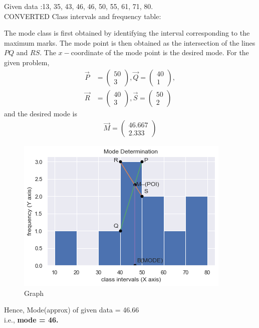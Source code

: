 \documentclass[journal,12pt,twocolumn]{IEEEtran}
\begin{document}
Given data :13, 35, 43, 46, 46, 50, 55, 61, 71, 80.\\ [12pt]
CONVERTED Class intervals and frequency table:\\[16pt]

\begin{table}[h]
    \centering
	
    \caption{}
    \label{TABLE}
\end{table}

The mode class is first obtained by identifying the interval corresponding to the maximum marks. The mode point is then obtained as the intersection of the lines $PQ$ and $RS$. The $x-$coordinate of the mode point is the desired mode. For the
given problem,\\
\newcommand{\myvec}[1]{\ensuremath{\begin{pmatrix}#1\end{pmatrix}}}
	\begin{align}
	\vec{P} &= \myvec{50 \\ 3},
	\vec{Q} = \myvec{40 \\ 1},\\[12pt]
	\vec{R} &= \myvec{40 \\ 3},
	\vec{S} = \myvec{50 \\ 2}
 	\end{align}
and the desired mode is
\begin{align}
	\vec{M} = \myvec{46.667 \\ 2.333}
\end{align}
\begin{figure}
	\centering
	\includegraphics[scale=0.8]{graph.png}
	\caption{Graph}
\end{figure}	
Hence, Mode(approx) of given data = 46.66\\
i.e., \textbf{mode = 46.}\\
\end{document}
